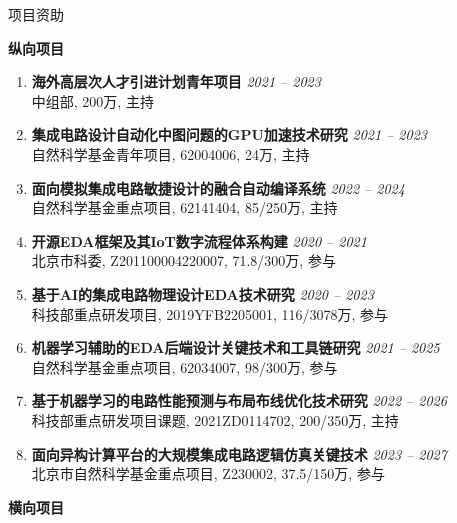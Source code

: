 
\begin{rSection}{项目资助}


\textbf{纵向项目}
        
\begin{enumerate}[font=\normalfont]

\item
{\bf 海外高层次人才引进计划青年项目 } \hfill{\em 2021 -- 2023} \\
中组部, 200万, 主持

\item 
{\bf 集成电路设计自动化中图问题的GPU加速技术研究 } \hfill{\em 2021 -- 2023} \\
自然科学基金青年项目, 62004006, 24万, 主持

\item 
{\bf 面向模拟集成电路敏捷设计的融合自动编译系统 } \hfill{\em 2022 -- 2024} \\
自然科学基金重点项目, 62141404, 85/250万, 主持

\item 
{\bf 开源EDA框架及其IoT数字流程体系构建 } \hfill{\em 2020 -- 2021} \\
北京市科委, Z201100004220007, 71.8/300万, 参与

\item 
{\bf 基于AI的集成电路物理设计EDA技术研究 } \hfill{\em 2020 -- 2023} \\
科技部重点研发项目, 2019YFB2205001, 116/3078万, 参与

\item 
{\bf 机器学习辅助的EDA后端设计关键技术和工具链研究 } \hfill{\em 2021 -- 2025} \\
自然科学基金重点项目, 62034007, 98/300万, 参与

\item 
{\bf 基于机器学习的电路性能预测与布局布线优化技术研究 } \hfill{\em 2022 -- 2026} \\
科技部重点研发项目课题, 2021ZD0114702, 200/350万, 主持

\item 
{\bf 面向异构计算平台的大规模集成电路逻辑仿真关键技术 } \hfill{\em 2023 -- 2027} \\
北京市自然科学基金重点项目, Z230002, 37.5/150万, 参与

\end{enumerate}
    
\textbf{横向项目}
        
\begin{enumerate}[font=\normalfont]


\end{enumerate}
\end{rSection}
